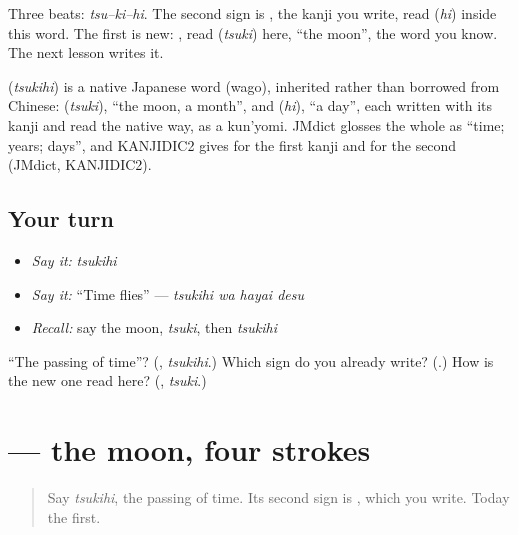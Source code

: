 Three beats: \emph{tsu–ki–hi}. The second sign is \textbf{}, the kanji you write, read \textbf{} (\emph{hi}) inside this word. The first is new: \textbf{}, read \textbf{} (\emph{tsuki}) here, \textquotedblleft{}the moon\textquotedblright{}, the word you know. The next lesson writes it.

\begin{cousinweb}
\textbf{} (\emph{tsukihi}) is a native Japanese word (wago), inherited rather than borrowed from Chinese: \textbf{} (\emph{tsuki}), \textquotedblleft{}the moon, a month\textquotedblright{}, and \textbf{} (\emph{hi}), \textquotedblleft{}a day\textquotedblright{}, each written with its kanji and read the native way, as a kun'yomi. JMdict glosses the whole as \textquotedblleft{}time; years; days\textquotedblright{}, and KANJIDIC2 gives  for the first kanji and  for the second (JMdict, KANJIDIC2).
\end{cousinweb}

\subsection*{Your turn}
\begin{itemize}
\raggedright
  \item \emph{Say it:} \emph{tsukihi}
  \item \emph{Say it:} \textquotedblleft{}Time flies\textquotedblright{} — \emph{tsukihi wa hayai desu}
  \item \emph{Recall:} say the moon, \emph{tsuki}, then \emph{tsukihi}
\end{itemize}

\begin{tcolorbox}[breakable,colback=teal!4,colframe=teal!35!black,title={Before you move on}]
\textquotedblleft{}The passing of time\textquotedblright{}? (\textbf{}, \emph{tsukihi}.) Which sign do you already write? (\textbf{}.) How is the new one read here? (\textbf{}, \emph{tsuki}.)
\end{tcolorbox}
\section[\texorpdfstring{\ja{月} (tsuki)}{月 (tsuki)}]{ — the moon, four strokes}

\label{lesson:JA-W252-tsuki-kanji}



\begin{quote}
Say \emph{tsukihi}, the passing of time. Its second sign is \textbf{}, which you write. Today the first.
\end{quote}

